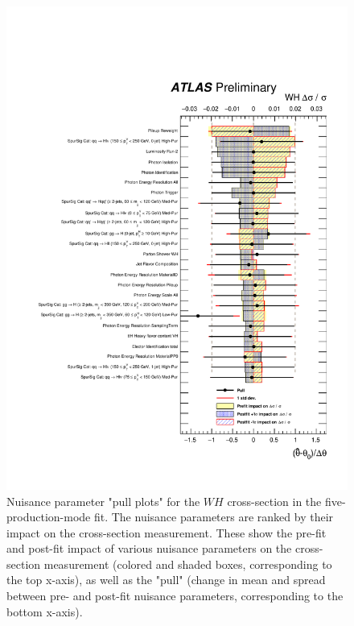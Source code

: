 \begin{figure}[htbp]
  \centering
  \includegraphics[width=0.9\linewidth]{figures/couplings_chapter/pulls_mu_WH}
  \caption{Nuisance parameter "pull plots" for the $WH$ cross-section in the five-production-mode fit. The nuisance parameters are ranked by their impact on the cross-section measurement. These show the pre-fit and post-fit impact of various nuisance parameters on the cross-section measurement (colored and shaded boxes, corresponding to the top x-axis), as well as the "pull" (change in mean and spread between pre- and post-fit nuisance parameters, corresponding to the bottom x-axis).}
  \label{fig:ranking_WH}
\end{figure}

